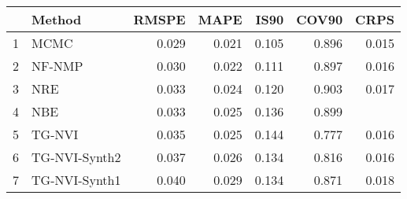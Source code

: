 \documentclass[12pt]{article}
\begin{document}
\thispagestyle{empty}
\begin{table}[ht]
\centering
\begin{tabular}{rlrrrrr}
  \hline
 & Method & RMSPE & MAPE & IS90 & COV90 & CRPS \\ 
  \hline
1 & MCMC & 0.029 & 0.021 & 0.105 & 0.896 & 0.015 \\ 
  2 & NF-NMP & 0.030 & 0.022 & 0.111 & 0.897 & 0.016 \\ 
  3 & NRE & 0.033 & 0.024 & 0.120 & 0.903 & 0.017 \\ 
  4 & NBE & 0.033 & 0.025 & 0.136 & 0.899 &  \\ 
  5 & TG-NVI & 0.035 & 0.025 & 0.144 & 0.777 & 0.016 \\ 
  6 & TG-NVI-Synth2 & 0.037 & 0.026 & 0.134 & 0.816 & 0.016 \\ 
  7 & TG-NVI-Synth1 & 0.040 & 0.029 & 0.134 & 0.871 & 0.018 \\ 
   \hline
\end{tabular}
\end{table}
\end{document}

